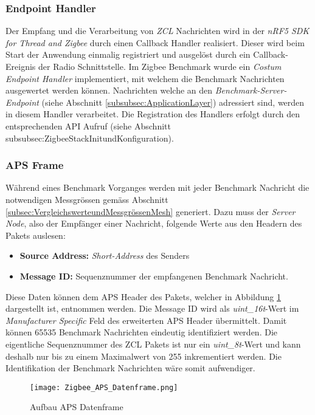 \subsubsection{Endpoint Handler}\label{subsubsec:EnpointHandler}
Der Empfang und die Verarbeitung von \textit{ZCL} Nachrichten wird in der \textit{nRF5 SDK for Thread and Zigbee} durch einen Callback Handler realisiert.
Dieser wird beim Start der Anwendung einmalig registriert und ausgelöst durch ein Callback-Ereignis der Radio Schnittstelle.
Im Zigbee Benchmark wurde ein \textit{Costum Endpoint Handler} implementiert, mit welchem die Benchmark Nachrichten ausgewertet werden können.
Nachrichten welche an den \textit{Benchmark-Server-Endpoint} (siehe Abschnitt \ref{subsubsec:ApplicationLayer}) adressiert sind, werden in diesem Handler verarbeitet.
Die Registration des Handlers erfolgt durch den entsprechenden API Aufruf (siehe Abschnitt {subsubsec:ZigbeeStackInitundKonfiguration}).

\subsubsection{APS Frame}\label{subsubsec:ZigbeeAPSFrame}
Während eines Benchmark Vorganges werden mit jeder Benchmark Nachricht die notwendigen Messgrössen gemäss Abschnitt \ref{subsec:VergleichswerteundMessgrössenMesh} generiert.
Dazu muss der \textit{Server Node}, also der Empfänger einer Nachricht, folgende Werte aus den Headern des Pakets auslesen:

\begin{itemize}
\item \textbf{Source Address:} \textit{Short-Address} des Senders
\item \textbf{Message ID:} Sequenznummer der empfangenen Benchmark Nachricht.
\end{itemize}

Diese Daten können dem APS Header des Pakets, welcher in Abbildung \ref{fig:AufbauAPSDatenframe} dargestellt ist, entnommen werden.
Die Message ID wird als \textit{uint\_16t}-Wert im \textit{Manufacturer Specific} Feld des erweiterten APS Header übermittelt.
Damit können 65535 Benchmark Nachrichten eindeutig identifiziert werden.
Die eigentliche Sequenznummer des ZCL Pakets ist nur ein \textit{uint\_8t}-Wert und kann deshalb nur bis zu einem Maximalwert von 255 inkrementiert werden.
Die Identifikation der Benchmark Nachrichten wäre somit aufwendiger.

\begin{figure}[h]
	\centering
	\texttt{[image: Zigbee\_APS\_Datenframe.png]}
	\caption{Aufbau APS Datenframe \cite{markus_krause_rainer_konrad_drahtlose_2014}}
	\label{fig:AufbauAPSDatenframe}
\end{figure}


